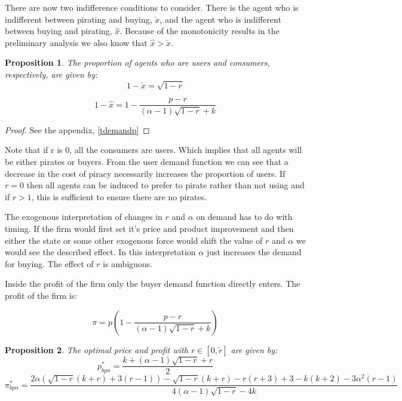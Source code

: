 \documentclass[12pt]{article}
\newtheorem{proposition}{Proposition}
\numberwithin{equation}{section}
\begin{document}
There are now two indifference conditions to consider. There is the agent who is indifferent between pirating and buying, $\check{x}$, and the agent who is indifferent between buying and pirating, $\hat{x}$. Because of the monotonicity results in the preliminary analysis we also know that $\hat{x}>\check{x}$.  

\begin{proposition}\label{tdemand}
The proportion of agents who are users and consumers, respectively, are given by:
\begin{equation}\label{eq:1}
1 -\check{x} = \sqrt{1-r}
\end{equation}

\begin{equation}\label{eq:2}
1 - \hat{x}= 1 - \frac{p-r}{(\alpha - 1) \sqrt{1-r} +k}
\end{equation}


\end{proposition}

\begin{proof}
See the appendix, \ref{tdemandp}
\end{proof}

Note that if r is 0, all the consumers are users. Which implies that all agents will be either pirates or buyers. From the user demand function we can see that a decrease in the cost of piracy necessarily increases the proportion of users. If $r=0$ then all agents can be induced to prefer to pirate rather than not using and if $r>1$, this is sufficient to ensure there are no pirates. 

The exogenous interpretation of changes in $r$ and $\alpha$ on demand has to do with timing. If the firm would first set it's price and product improvement and then either the state or some other exogenous force would shift the value of $r$ and $\alpha$ we would see the described effect. In this interpretation $\alpha$ just increases the demand for buying. The effect of $r$ is ambiguous. 

Inside the profit of the firm only the buyer demand function directly enters. The profit of the firm is: 

\begin{equation*}
\pi = p\left( 
1 - \frac{p-r}{(\alpha - 1) \sqrt{1-r} +k}
\right) 
\end{equation*}

\begin{proposition}
The optimal price and profit with $r \in[0, \tilde{r}]$ are given by:
\begin{equation}\label{TNB}
p_{bpn}^* = \frac{k+ (\alpha-1)\sqrt{ 1 -r }+r}{2}
\end{equation}
\begin{equation}
\pi_{bpn}^* = \frac{2 \alpha \left( \sqrt{1-r}(k+r)+3(r-1) \right)-\sqrt{1-r}(k+r)-r(r+3)+3-k(k+2)-3 \alpha^2 (r-1)}{4 (  \alpha -1 ) \sqrt{1-r}-4 k }
\end{equation}
\end{proposition}
\end{document}
